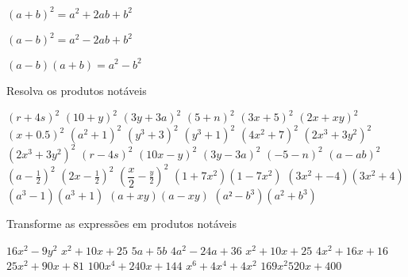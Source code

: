 \documentclass[10pt,a4paper]{article}
\begin{document}



	\begin{multicols}{2}

	  \setlength\columnseprule{0.6pt} %

    $(a + b)^2 = a^2 + 2ab + b^2$

    $(a - b)^2 = a^2 - 2ab + b^2$

    $(a - b)(a + b) = a^2 - b^2$

    \begin{question}[type=exam]
        Resolva os produtos notáveis

        \begin{tasks}
            \task $(r + 4s)^2$
            \task $(10 + y)^2$
            \task $(3y + 3a)^2$
            \task $(5 + n)^2$
            \task $(3x + 5)^2$
            \task $(2x + xy)^2$
            \task $(x + 0.5)^2$
            \task $(a^2 + 1)^2$
            \task $(y^3 + 3)^2$
            \task $(y^3 + 1)^2$
            \task $(4x^2 + 7)^2$
            \task $(2x^3 + 3y^2)^2$
            \task $(2x^3 + 3y^2)^2$
            \task $(r - 4s)^2$
            \task $(10x - y)^2$
            \task $(3y - 3a)^2$
            \task $(-5 - n)^2$
            \task $(a - ab)^2$
            \task $(a - \frac{1}{2})^2$
            \task $(2x - \frac{1}{2})^2$
            \task $(\dfrac{x}{2} - \frac{y}{2})^2$
            \task $(1 + 7x^2)(1 - 7x^2)$
            \task $(3x^2 + -4)(3x^2 + 4)$
            \task $(a^3 - 1)(a^3+1)$
            \task $(a + xy)(a - xy)$
            \task $(a² - b^3)(a^2 + b^3)$
        \end{tasks}
    \end{question}

    \begin{question}[type=exam]
        Transforme as expressões em produtos notáveis

        \begin{tasks}
            \task $16x^2 - 9y^2$
            \task $x^2 + 10x + 25$
            \task $5a + 5b$
            \task $4a^2 - 24a + 36$
            \task $x^2 + 10x + 25$
            \task $4x^2 + 16x + 16$
            \task $25x^2 + 90x + 81$
            \task $100x^4 + 240x + 144$
            \task $x^6 + 4x^4 + 4x^2$
            \task $169x^2  520x + 400$
        \end{tasks}
    \end{question}


\end{multicols}
\end{document}
